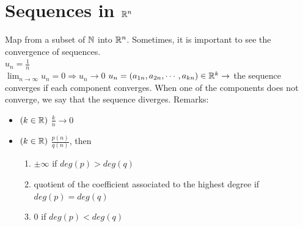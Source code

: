 \section{Sequences in $\mathbb{R}^n$}
Map from a subset of $\mathbb{N}$ into $\mathbb{R}^n$.
Sometimes, it is important to see the convergence of sequences.\\
$u_n = \frac{1}{n}$\\
$\lim_{n\to\infty} u_n = 0 \Rightarrow u_n\rightarrow0$
$u_n = (a_{1n}, a_{2n}, \cdots, a_{kn})\in\mathbb{R}^k\rightarrow$ the sequence converges if each component converges.
When one of the components does not converge, we say that the sequence diverges.
Remarks:
\begin{itemize}
    \item $(k\in\mathbb{R})$ $\frac{k}{n}\rightarrow 0$
    \item $(k\in\mathbb{R})$ $\frac{p(n)}{q(n)}$, then
        \begin{enumerate}
            \item $\pm\infty$ if $deg(p)>deg(q)$
            \item quotient of the coefficient associated to the highest degree if $deg(p)=deg(q)$
            \item 0 if $deg(p)<deg(q)$
        \end{enumerate}
\end{itemize}
